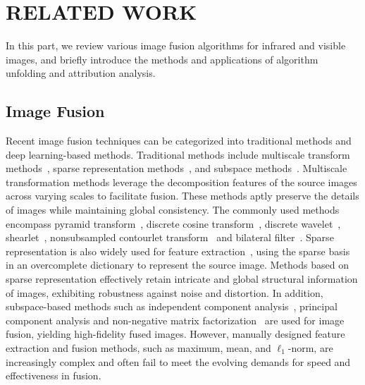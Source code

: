 \section{RELATED WORK}
\label{sec:2}
In this part, we review various image fusion algorithms for infrared and visible images, and briefly introduce the methods and applications of algorithm unfolding and attribution analysis.
\subsection{Image Fusion}
Recent image fusion techniques can be categorized into traditional methods and deep learning-based methods.
Traditional methods include multiscale transform methods~\cite{DBLP:journals/sigpro/LiuJWSD14,DBLP:journals/ijon/LiuMD17,DBLP:journals/isci/0019LLM020}, sparse representation methods~\cite{DBLP:journals/tip/LiWK20,DBLP:journals/spl/LiuCWW16}, and subspace methods~\cite{DBLP:conf/icip/CvejicLBC06}.
Multiscale transformation methods leverage the decomposition features of the source images across varying scales to facilitate fusion. 
These methods aptly preserve the details of images while maintaining global consistency.
The commonly used methods encompass pyramid transform~\cite{BULANON200912}, discrete cosine transform~\cite{JIN20181, DBLP:journals/mta/EKR19}, discrete wavelet~\cite{DBLP:journals/sigpro/LiuJWSD14}, shearlet~\cite{ 
DBLP:journals/ijon/LiuMD17}, nonsubsampled contourlet transform~\cite{XIANG201553} and bilateral filter~\cite{DBLP:journals/inffus/HuL12}.
Sparse representation is also widely used for feature extraction~\cite{DBLP:journals/tip/LiWK20,DBLP:journals/spl/LiuCWW16}, using the sparse basis in an overcomplete dictionary to represent the source image. 
Methods based on sparse representation effectively retain intricate and global structural information of images, exhibiting robustness against noise and distortion.
In addition, subspace-based methods such as independent component analysis~\cite{DBLP:conf/icip/CvejicLBC06}, principal component analysis and non-negative matrix factorization~\cite{DBLP:conf/icip/ZhangWMW04} are used for image fusion, yielding high-fidelity fused images.
However, manually designed feature extraction and fusion methods, such as maximum, mean, and $\ell_1$-norm, are increasingly complex and often fail to meet the evolving demands for speed and effectiveness in fusion.

